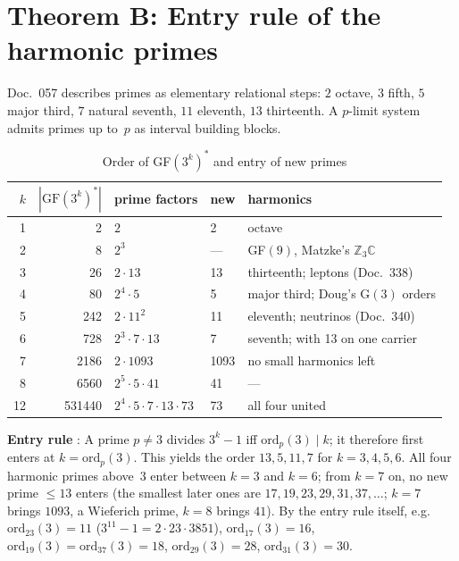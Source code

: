 \section{Theorem B: Entry rule of the harmonic primes}

Doc.~057 describes primes as elementary relational steps: $2$ octave, $3$ fifth,
$5$ major third, $7$ natural seventh, $11$ eleventh, $13$ thirteenth.
A $p$-limit system admits primes up to~$p$ as interval building blocks.

\begin{table}[H]
\centering
\caption{Order of GF$(3^k)^*$ and entry of new primes}
\begin{tabular}{rrlll}
\toprule
$k$ & $|\text{GF}(3^k)^*|$ & prime factors & new & harmonics \\
\midrule
1 & 2 & $2$ & 2 & octave \\
2 & 8 & $2^3$ & --- & GF$(9)$, Matzke's $\mathbb{Z}_3\mathbb{C}$ \\
3 & 26 & $2 \cdot 13$ & 13 & thirteenth; leptons (Doc.~338) \\
4 & 80 & $2^4 \cdot 5$ & 5 & major third; Doug's G$(3)$ orders \\
5 & 242 & $2 \cdot 11^2$ & 11 & eleventh; neutrinos (Doc.~340) \\
6 & 728 & $2^3 \cdot 7 \cdot 13$ & 7 & seventh; with 13 on one carrier \\
7 & 2186 & $2 \cdot 1093$ & 1093 & no small harmonics left \\
8 & 6560 & $2^5 \cdot 5 \cdot 41$ & 41 & --- \\
12 & 531440 & $2^4 \cdot 5 \cdot 7 \cdot 13 \cdot 73$ & 73 & all four united \\
\bottomrule
\end{tabular}
\end{table}

\textbf{Entry rule} \BM: A prime $p \neq 3$ divides $3^k - 1$ iff
$\text{ord}_p(3) \mid k$; it therefore first enters at $k = \text{ord}_p(3)$.
This yields the order $13, 5, 11, 7$ for $k = 3, 4, 5, 6$. All four harmonic primes
above~3 enter between $k=3$ and $k=6$; from $k=7$ on, no new prime $\leq 13$ enters
(the smallest later ones are $17, 19, 23, 29, 31, 37, \dots$; $k=7$ brings $1093$, a Wieferich prime, $k=8$ brings $41$). By the entry rule itself, e.g.\ $\text{ord}_{23}(3)=11$ ($3^{11}-1=2\cdot23\cdot3851$), $\text{ord}_{17}(3)=16$, $\text{ord}_{19}(3)=\text{ord}_{37}(3)=18$, $\text{ord}_{29}(3)=28$, $\text{ord}_{31}(3)=30$.

